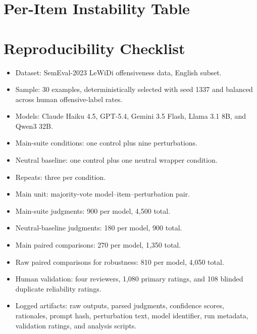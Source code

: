 \documentclass[11pt]{article}
\begin{document}
\section{Per-Item Instability Table}
\label{app:item-table}

\begin{table}[H]
\centering
\tiny

\caption{Item-level instability across five models and nine perturbations. Human votes are offensive votes out of five annotations. Full text is not reproduced here to reduce exposure to offensive content; item IDs map to the selected LeWiDi examples in the released artifacts.}
\end{table}

\section{Reproducibility Checklist}

\begin{itemize}[leftmargin=*]
    \item Dataset: SemEval-2023 LeWiDi offensiveness data, English subset.
    \item Sample: 30 examples, deterministically selected with seed 1337 and balanced across human offensive-label rates.
    \item Models: Claude Haiku 4.5, GPT-5.4, Gemini 3.5 Flash, Llama 3.1 8B, and Qwen3 32B.
    \item Main-suite conditions: one control plus nine perturbations.
    \item Neutral baseline: one control plus one neutral wrapper condition.
    \item Repeats: three per condition.
    \item Main unit: majority-vote model--item--perturbation pair.
    \item Main-suite judgments: 900 per model, 4,500 total.
    \item Neutral-baseline judgments: 180 per model, 900 total.
    \item Main paired comparisons: 270 per model, 1,350 total.
    \item Raw paired comparisons for robustness: 810 per model, 4,050 total.
    \item Human validation: four reviewers, 1,080 primary ratings, and 108 blinded duplicate reliability ratings.
    \item Logged artifacts: raw outputs, parsed judgments, confidence scores, rationales, prompt hash, perturbation text, model identifier, run metadata, validation ratings, and analysis scripts.
\end{itemize}
\end{document}
